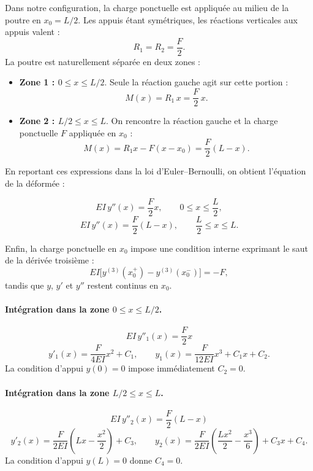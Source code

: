 \documentclass[12pt, a4paper]{article}
\begin{document}
\vspace{1em}
Dans notre configuration, la charge ponctuelle est appliquée au milieu de la poutre en 
\(
x_0 = L/2.
\)
Les appuis étant symétriques, les réactions verticales aux appuis valent :
\[
R_1 = R_2 = \frac{F}{2}.
\]
\vspace{1em}
La poutre est naturellement séparée en deux zones :

\begin{itemize}
    \item \textbf{Zone 1 : $0 \le x \le L/2$}.  
    Seule la réaction gauche agit sur cette portion :
    \[
    M(x) = R_1\, x = \frac{F}{2}\, x.
    \]

    \item \textbf{Zone 2 : $L/2 \le x \le L$}.  
    On rencontre la réaction gauche et la charge ponctuelle $F$ appliquée en $x_0$ :
    \[
    M(x) = R_1 x - F(x - x_0)
    =\frac{F}{2}(L - x).
    \]
\end{itemize}
\vspace{1em}

En reportant ces expressions dans la loi d’Euler–Bernoulli, on obtient l’équation de la déformée :

\[
EI\,y''(x) = \frac{F}{2}x, \qquad 0 \le x \le \frac{L}{2},
\]
\[
EI\,y''(x) = \frac{F}{2}(L-x), \qquad \frac{L}{2} \le x \le L.
\]

\vspace{1em}

Enfin, la charge ponctuelle en $x_0$ impose une condition interne exprimant le saut de la dérivée
troisième :
\[
EI\big[y^{(3)}(x_0^+) - y^{(3)}(x_0^-)\big] = -F,
\]
tandis que $y$, $y'$ et $y''$ restent continus en $x_0$.

\paragraph{Intégration dans la zone $0\le x\le L/2$.}
\[
EI\,y''_1(x)=\frac{F}{2}x
\]
\[
y'_1(x)=\frac{F}{4EI}x^2 + C_1,
\qquad
y_1(x)=\frac{F}{12EI}x^3 + C_1 x + C_2.
\]
La condition d'appui $y(0)=0$ impose immédiatement $C_2=0$.

\paragraph{Intégration dans la zone $L/2\le x\le L$.}
\[
EI\,y''_2(x)=\frac{F}{2}(L-x)
\]
\[
y'_2(x)=\frac{F}{2EI}\left(Lx - \frac{x^2}{2}\right)+C_3,
\qquad
y_2(x)=\frac{F}{2EI}\left(\frac{Lx^2}{2}-\frac{x^3}{6}\right)+C_3x+C_4.
\]
La condition d'appui $y(L)=0$ donne $C_4=0$.
\end{document}

